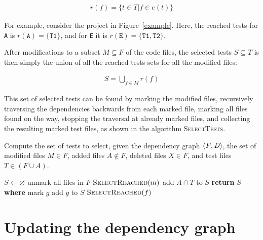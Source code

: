 {\begin{eqnarray}
r(f) = \{t \in T | f \in e(t)\} \nonumber
\end{eqnarray}

For example, consider the project in Figure~\ref{example}. Here, the reached tests for \texttt{A} is $r(\texttt{A}) = \{\texttt{T1}\}$, and for \texttt{E} it is $r(\texttt{E}) = \{\texttt{T1}, \texttt{T2}\}$.

After modifications to a subset $M \subseteq F$ of the code files, the selected tests $S \subseteq T$ is then simply the union of all the reached tests sets for all the modified files:

\begin{eqnarray}
S = \bigcup_{f \in M} {r(f)} \nonumber
\end{eqnarray}

This set of selected tests can be found by marking the modified files, recursively traversing the dependencies backwards from each marked file, marking all files found on the way, stopping the traversal at already marked files, and collecting the resulting marked test files, as shown in the  algorithm \textsc{SelectTests}.

\begin{algorithm}
\caption{Compute the set of tests to select, given the dependency graph $\left \langle \mathit{ F,D }\right \rangle $, the set of modified files $M \in F$, added files $A \notin F$, deleted files $X \in F$, and test files $T \in (F \cup A)$. }\label{select}
\begin{algorithmic}
   \State $S\gets \varnothing$
   \State unmark all files in $F$
      \State $\Call{SelectReached}{m}$
   \EndFor
   \State add $A \cap T$ to $S$ 
   \State \textbf{return} $S$ 
   \State
   \State \textbf{where}
        \State mark $g$
            \State add $g$ to $S$ 
        \EndIf
          \State $\Call{SelectReached}{f}$
        \EndFor
      \EndIf
   \EndProcedure
\EndProcedure
\end{algorithmic}
\end{algorithm}

\newpage
\section{Updating the dependency graph}
\label{IncrementalUpdate}

}

